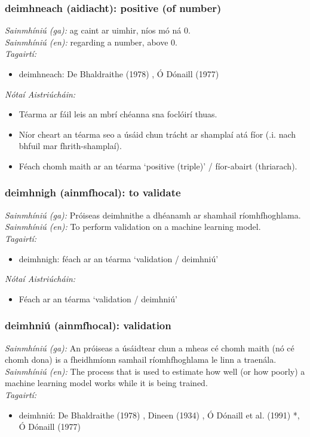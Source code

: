 \documentclass{article}
\begin{document}
\subsubsection*{deimhneach (aidiacht): positive (of number)}
 \noindent \textit{Sainmhíniú (ga):} ag caint ar uimhir, níos mó ná 0.
\\
 \noindent \textit{Sainmhíniú (en):} regarding a number, above 0.
\\
 \noindent \textit{Tagairtí:}
\begin{itemize}
	\item deimhneach: De Bhaldraithe (1978) \cite{de-bhaldraithe}, Ó Dónaill (1977) \cite{odonaill}
\end{itemize}

 \noindent \textit{Nótaí Aistriúcháin:}
\begin{itemize}
	\item Téarma ar fáil leis an mbrí chéanna sna foclóirí thuas.
	\item Níor cheart an téarma seo a úsáid chun trácht ar shamplaí atá fíor (.i. nach bhfuil mar fhrith-shamplaí).
	\item Féach chomh maith ar an téarma `positive (triple)' / fíor-abairt (thriarach).
\end{itemize}


\subsubsection*{deimhnigh (ainmfhocal): to validate}
 \noindent \textit{Sainmhíniú (ga):} Próiseas deimhnithe a dhéanamh ar shamhail ríomhfhoghlama.
\\
 \noindent \textit{Sainmhíniú (en):} To perform validation on a machine learning model.
\\
 \noindent \textit{Tagairtí:}
\begin{itemize}
	\item deimhnigh: féach ar an téarma `validation / deimhniú'
\end{itemize}

 \noindent \textit{Nótaí Aistriúcháin:}
\begin{itemize}
	\item Féach ar an téarma `validation / deimhniú'
\end{itemize}


\subsubsection*{deimhniú (ainmfhocal): validation}
 \noindent \textit{Sainmhíniú (ga):} An próiseas a úsáidtear chun a mheas cé chomh maith (nó cé chomh dona) is a fheidhmíonn samhail ríomhfhoghlama le linn a traenála.
\\
 \noindent \textit{Sainmhíniú (en):} The process that is used to estimate how well (or how poorly) a machine learning model works while it is being trained.
\\
 \noindent \textit{Tagairtí:}
\begin{itemize}
	\item deimhniú: De Bhaldraithe (1978) \cite{de-bhaldraithe}, Dineen (1934) \cite{dineen}, Ó Dónaill et al. (1991) \cite{focloir-beag}*, Ó Dónaill (1977) \cite{odonaill}
\end{itemize}
\end{document}

